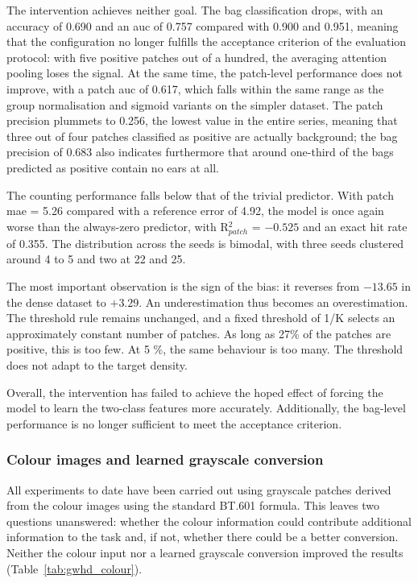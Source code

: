 \documentclass[12pt,parskip = half, DIV=classic,listof=totoc]{scrartcl}
\begin{document}
			The intervention achieves neither goal. The bag classification drops, with an accuracy of 0.690 and an \ac{auc} of 0.757
			compared with 0.900 and 0.951, meaning that the configuration no longer fulfills the
			acceptance criterion of the evaluation protocol: with five positive patches out of a hundred, the averaging attention pooling loses the
			signal. At the same time, the patch-level performance does not improve, with a patch \ac{auc} of 0.617,
			which falls within the same range as the group normalisation and sigmoid variants on
			the simpler dataset. The patch precision plummets to 0.256, the lowest value in the entire series, meaning that three out of four
			patches classified as positive are actually background; the bag precision of 0.683 also indicates
			furthermore that around one-third of the bags predicted as positive
 			contain no ears at all.

			The counting performance falls below that of the trivial predictor. With patch \ac{mae} = 5.26 compared with a reference error of 4.92, 
			the model is once again worse than the always-zero predictor, with R$^2_{patch}$ = $-0.525$ and an exact hit rate of 0.355. The distribution
			across the seeds is bimodal, with three seeds clustered around 4 to 5 and two at 22
			and 25.

			The most important observation is the sign of the bias: it reverses
			from $-13.65$ in the dense dataset to $+3.29$. An underestimation thus becomes
			an overestimation. The threshold rule remains unchanged, and a fixed threshold
			of 1/K selects an approximately constant number of patches. As long as 27\%
			of the patches are positive, this is too few. At 5 \%, the same
			behaviour is too many. The threshold does not adapt to the target density.

			Overall, the intervention has failed to achieve the hoped effect of forcing the model to learn the two-class features more accurately. 
			Additionally, the bag-level performance is no longer sufficient to meet the acceptance criterion.

			\subsubsection{Colour images and learned grayscale conversion}\label{sec:gwhd_color}

			All experiments to date have been carried out using grayscale patches derived from the
			colour images using the standard BT.601 formula. This leaves two questions
			unanswered: whether the colour information could contribute additional information to the task and, if not, whether there 
			could be a better conversion. Neither the colour input nor a learned grayscale conversion improved the results (Table~\ref{tab:gwhd_colour}).
\end{document}
